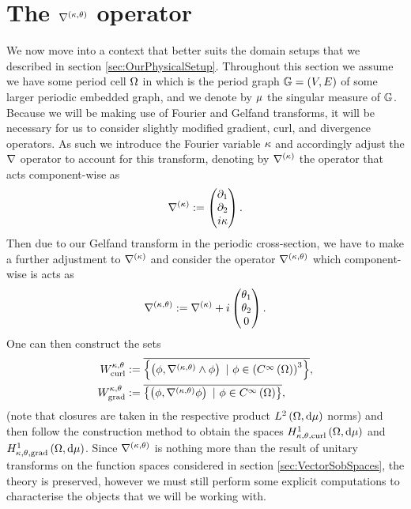 \section{The $\nabla^{\left( \kappa, \theta \right)}$ operator} \label{sec:ktOperator}
We now move into a context that better suits the domain setups that we described in section \ref{sec:OurPhysicalSetup}.
Throughout this section we assume we have some period cell $\Omega$ in which is the period graph $\mathbb{G}=\left( V,E \right)$ of some larger periodic embedded graph, and we denote by $\mu$ the singular measure of $\mathbb{G}$.
Because we will be making use of Fourier and Gelfand transforms, it will be necessary for us to consider slightly modified gradient, curl, and divergence operators.
As such we introduce the Fourier variable $\kappa$ and accordingly adjust the $\nabla$ operator to account for this transform, denoting by $\nabla^{(\kappa)}$ the operator that acts component-wise as
\begin{align*}
	\nabla^{(\kappa)} := \begin{pmatrix} \partial_1 \\ \partial_2 \\ i\kappa\end{pmatrix}.
\end{align*}
Then due to our Gelfand transform in the periodic cross-section, we have to make a further adjustment to $\nabla^{(\kappa)}$ and consider the operator $\nabla^{\left( \kappa, \theta \right)}$ which component-wise is acts as
\begin{align*}
	\nabla^{\left( \kappa, \theta \right)} := \nabla^{(\kappa)} + i\begin{pmatrix} \theta_1 \\ \theta_2 \\ 0 \end{pmatrix}.
\end{align*}
One can then construct the sets
\begin{subequations} \label{eq:WktDefinitions}
	\begin{align}
		W^{\wavenumber, \qm}_{\mathrm{curl}} &:= \overline{ \clbracs{ \bracs{\phi, \ktcurl{}\phi} \ \vert \ \phi\in\bracs{\smooth{\ddom}}^3 } }, \\
		W^{\wavenumber, \qm}_{\mathrm{grad}} &:= \overline{ \clbracs{ \bracs{\phi, \ktgrad\phi} \ \vert \ \phi\in\smooth{\ddom} } },
	\end{align}
\end{subequations}
(note that closures are taken in the respective product $L^{2}\left( \Omega,\mathrm{d}\mu \right)$ norms) and then follow the construction method to obtain the spaces $H^1_{\kappa,\theta,\mathrm{curl}}\left( \Omega, \mathrm{d}\mu \right)$ and $H^1_{\kappa,\theta,\mathrm{grad}}\left( \Omega, \mathrm{d}\mu \right)$.
Since $\nabla^{\left( \kappa, \theta \right)}$ is nothing more than the result of unitary transforms on the function spaces considered in section \ref{sec:VectorSobSpaces}, the theory is preserved, however we must still perform some explicit computations to characterise the objects that we will be working with.
